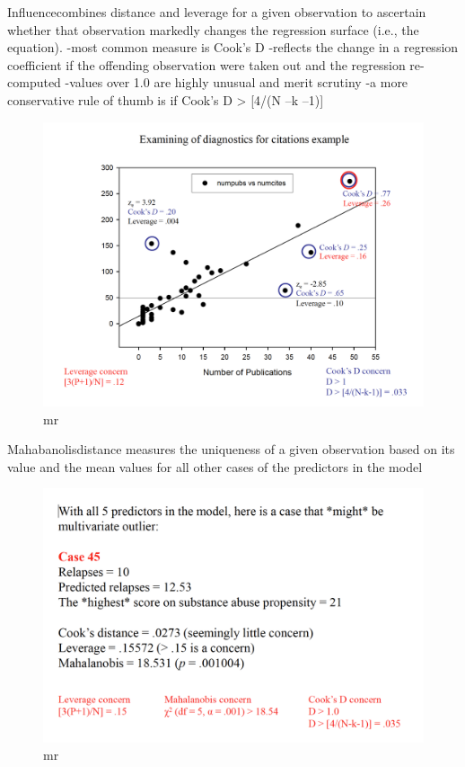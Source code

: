 \documentclass[]{book}
\theoremstyle{definition}
\theoremstyle{definition}
\theoremstyle{definition}
\theoremstyle{remark}
\begin{document}
Influencecombines distance and leverage for a given observation to
ascertain whether that observation markedly changes the regression
surface (i.e., the equation). -most common measure is Cook's D -reflects
the change in a regression coefficient if the offending observation were
taken out and the regression re-computed -values over 1.0 are highly
unusual and merit scrutiny -a more conservative rule of thumb is if
Cook's D \textgreater{} {[}4/(N --k --1){]}

\begin{figure}
\centering
\includegraphics{img/hicksmr19.png}
\caption{mr}
\end{figure}

Mahabanolisdistance measures the uniqueness of a given observation based
on its value and the mean values for all other cases of the predictors
in the model

\begin{figure}
\centering
\includegraphics{img/hicksmr20.png}
\caption{mr}
\end{figure}
\end{document}
